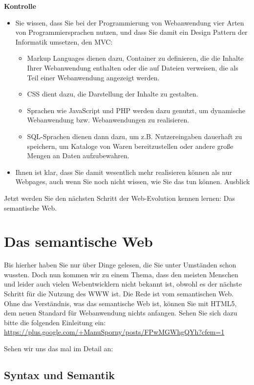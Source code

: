 \textbf{Kontrolle}\\

\begin{itemize}
	\item Sie wissen, dass Sie bei der Programmierung von Webanwendung vier Arten von Programmiersprachen nutzen, und dass Sie damit ein Design Pattern der Informatik umsetzen, den MVC:
	\begin{itemize}
		\item Markup Languages dienen dazu, Container zu definieren, die die Inhalte Ihrer Webanwendung enthalten oder die auf Dateien verweisen, die als Teil einer Webanwendung angezeigt werden.
		\item CSS dient dazu, die Darstellung der Inhalte zu gestalten.
		\item Sprachen wie JavaScript und PHP werden dazu genutzt, um dynamische Webanwendung bzw. Webanwendungen zu realisieren.
		\item SQL-Sprachen dienen dann dazu, um z.B. Nutzereingaben dauerhaft zu speichern, um Kataloge von Waren bereitzustellen oder andere große Mengen an Daten aufzubewahren.
	\end{itemize}
	\item Ihnen ist klar, dass Sie damit wesentlich mehr realisieren können als \glqq{}nur\grqq{} Webpages, auch wenn Sie noch nicht wissen, wie Sie das tun können.
	Ausblick
\end{itemize}

Jetzt werden Sie den nächsten Schritt der Web-Evolution kennen lernen: Das semantische Web.

\section{Das semantische Web}

Bis hierher haben Sie nur über Dinge gelesen, die Sie unter Umständen schon wussten. Doch nun kommen wir zu einem Thema, dass den meisten Menschen und leider auch vielen Webentwicklern nicht bekannt ist, obwohl es der nächste Schritt für die Nutzung des WWW ist. Die Rede ist vom semantischen Web. Ohne das Verständnis, was das semantische Web ist, können Sie mit HTML5, dem neuen Standard für Webanwendung nichts anfangen. Sehen Sie sich dazu bitte die folgenden Einleitung ein: \url{https://plus.google.com/+ManuSporny/posts/FPwMGWhgQYh?cfem=1}

Sehen wir uns das mal im Detail an:

\subsection{Syntax und Semantik}

